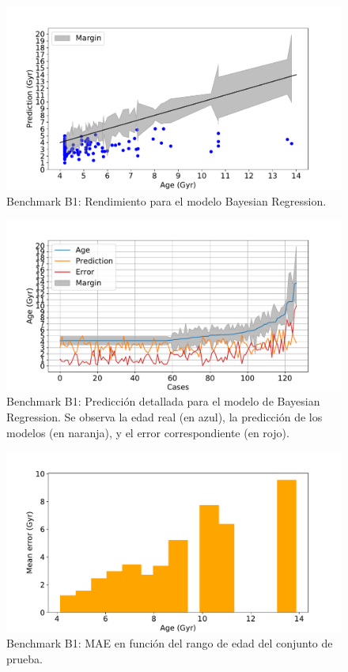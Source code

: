 \begin{figure}[H]
\begin{center}
 \includegraphics[width=0.8\linewidth]{Figuras/Experimentos/B_B1_bayes_1.pdf}
\end{center}
\caption{Benchmark B1: Rendimiento para el modelo Bayesian Regression.}
 \label{fig:benchB1_details_bayes_1}
\end{figure}

\begin{figure}[H]
\begin{center}
 \includegraphics[width=0.8\linewidth]{Figuras/Experimentos/B_B1_bayes_2.pdf}
\end{center}
\caption{Benchmark B1: Predicción detallada para el modelo de Bayesian Regression. Se observa la edad real (en azul), la predicción de los modelos (en naranja), y el error correspondiente (en rojo).}
 \label{fig:benchB1_details_bayes_2}
\end{figure}

\begin{figure}[H]
\begin{center}
 \includegraphics[width=0.8\linewidth]{Figuras/Experimentos/B_B1_bayes_3.pdf}
\end{center}
\caption{Benchmark B1: MAE en función del rango de edad del conjunto de prueba.}
 \label{fig:benchB1_details_bayes_3}
\end{figure}

